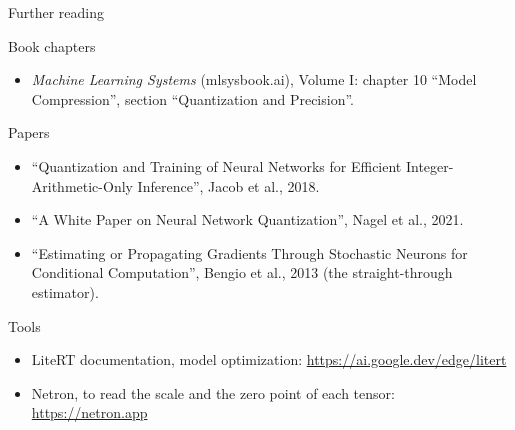 \begin{frame}{Further reading}
  \footnotesize
  \begin{block}{Book chapters}
    \begin{itemize}
      \item \emph{Machine Learning Systems} (mlsysbook.ai), Volume I: chapter
            10 ``Model Compression'', section ``Quantization and Precision''.
    \end{itemize}
  \end{block}
  \begin{block}{Papers}
    \begin{itemize}
      \item ``Quantization and Training of Neural Networks for Efficient
            Integer-Arithmetic-Only Inference'', Jacob et al., 2018.
      \item ``A White Paper on Neural Network Quantization'', Nagel et al.,
            2021.
      \item ``Estimating or Propagating Gradients Through Stochastic Neurons
            for Conditional Computation'', Bengio et al., 2013 (the
            straight-through estimator).
    \end{itemize}
  \end{block}
  \begin{block}{Tools}
    \begin{itemize}
      \item LiteRT documentation, model optimization:
            \url{https://ai.google.dev/edge/litert}
      \item Netron, to read the scale and the zero point of each tensor:
            \url{https://netron.app}
    \end{itemize}
  \end{block}
\end{frame}
